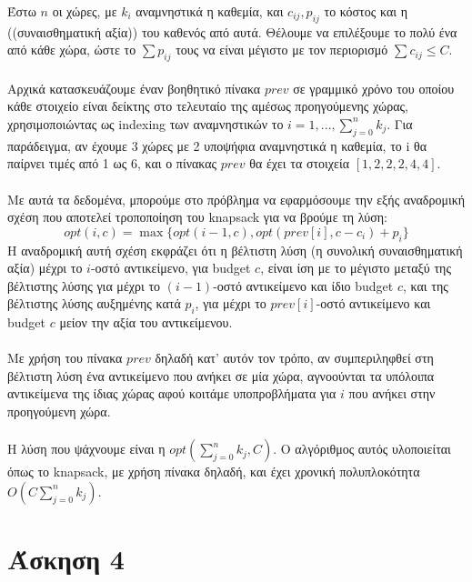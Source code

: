 \documentclass[12pt,a4paper]{article}
\begin{document}
    Έστω \( n \) οι χώρες, με \( k_i \)
    αναμνηστικά η καθεμία, και \( c_{ij}, p_{ij} \) το κόστος και η
    ((συναισθηματική αξία)) του καθενός από αυτά. Θέλουμε να επιλέξουμε το πολύ
    ένα από κάθε χώρα, ώστε το \( \sum{p_{ij}} \) τους να είναι μέγιστο με τον
    περιορισμό \( \sum{c_{ij}} \le C \).\\
    \\
    Αρχικά κατασκευάζουμε έναν βοηθητικό πίνακα \( prev \) σε γραμμικό χρόνο του
    οποίου κάθε στοιχείο είναι δείκτης στο τελευταίο της αμέσως προηγούμενης
    χώρας, χρησιμοποιώντας ως {\latintext indexing} των αναμνηστικών το
    \( i = 1, ..., \sum_{j=0}^{n}{k_j} \). Για παράδειγμα, αν έχουμε 3 χώρες με
    2 υποψήφια αναμνηστικά η καθεμία, το i θα παίρνει τιμές από 1 ως 6, και ο
    πίνακας \( prev \) θα έχει τα στοιχεία \( [1, 2, 2, 2, 4, 4] \).\\
    \\
    Mε αυτά τα δεδομένα, μπορούμε στο πρόβλημα να εφαρμόσουμε την εξής
    αναδρομική σχέση που αποτελεί τροποποίηση του {\latintext knapsack} για να
    βρούμε τη λύση:
    \[ opt(i, c) = \max\{ opt(i - 1, c), opt(prev[i], c - c_i) + p_i \} \]
    Η αναδρομική αυτή σχέση εκφράζει ότι η βέλτιστη λύση (η συνολική
    συναισθηματική αξία) μέχρι το \( i \)-οστό αντικείμενο,
    για {\latintext budget} \( c \), είναι ίση με το μέγιστο μεταξύ της
    βέλτιστης λύσης για μέχρι το \( (i - 1) \)-οστό αντικείμενο και ίδιο
    {\latintext budget} \( c \), και της βέλτιστης λύσης αυξημένης κατά \( p_i
    \), για μέχρι το \( prev[i] \)-οστό αντικείμενο και
    {\latintext budget} \( c \) μείον την αξία του αντικείμενου.\\
    \\
    Mε χρήση του πίνακα \( prev \) δηλαδή κατ' αυτόν τον τρόπο, αν συμπεριληφθεί
    στη βέλτιστη λύση ένα αντικείμενο που ανήκει σε μία χώρα, αγνοούνται τα
    υπόλοιπα αντικείμενα της ίδιας χώρας αφού κοιτάμε υποπροβλήματα για \( i \)
    που ανήκει στην προηγούμενη χώρα.\\
    \\
    H λύση που ψάχνουμε είναι η \( opt(\sum_{j=0}^{n}{k_j}, C) \).
    Ο αλγόριθμος αυτός υλοποιείται όπως το {\latintext knapsack}, με χρήση
    πίνακα δηλαδή, και έχει χρονική πολυπλοκότητα \( O(C\sum_{j=0}^{n}{k_j}) \). 

  \section{Άσκηση 4}
\end{document}
